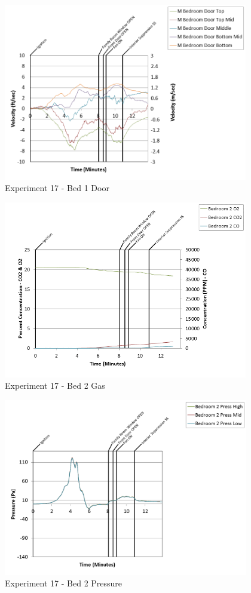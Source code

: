 \documentclass{article}
\begin{document}
\begin{appendices}
\clearpage

\begin{figure}[h!]
	\centering
	\includegraphics[height=3.05in]{0_Images/Results_Charts/Exp_17_Charts/Bed1Door.png}
	\caption{Experiment 17 - Bed 1 Door}
\end{figure}


\begin{figure}[h!]
	\centering
	\includegraphics[height=3.05in]{0_Images/Results_Charts/Exp_17_Charts/Bed2Gas.png}
	\caption{Experiment 17 - Bed 2 Gas}
\end{figure}

\clearpage

\begin{figure}[h!]
	\centering
	\includegraphics[height=3.05in]{0_Images/Results_Charts/Exp_17_Charts/Bed2Pressure.png}
	\caption{Experiment 17 - Bed 2 Pressure}
\end{figure}



\end{appendices}
\end{document}
